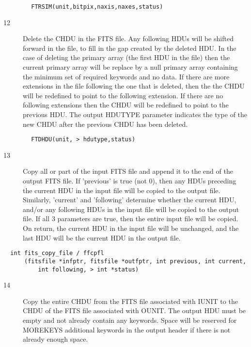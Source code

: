 \documentclass[11pt]{book}
\begin{document}
\begin{verbatim}
        FTRSIM(unit,bitpix,naxis,naxes,status)
\end{verbatim}

\begin{description}
\item[12] Delete the CHDU in the FITS file.  Any following HDUs will be shifted
    forward in the file, to fill in the gap created by the deleted
    HDU.  In the case of deleting the primary array (the first HDU in
    the file) then the current primary array will be replace by a null
    primary array containing the minimum set of required keywords and
    no data.  If there are more extensions in the file following the
    one that is deleted, then the the CHDU will be redefined to point
    to the following extension.  If there are no following extensions
    then the CHDU will be redefined to point to the previous HDU.  The
    output HDUTYPE parameter indicates the type of the new CHDU after
   the previous CHDU has been deleted.
\end{description}

\begin{verbatim}
        FTDHDU(unit, > hdutype,status)
\end{verbatim}

\begin{description}
\item[13]  Copy all or part of the input FITS file and append it
    to the end of the output FITS file.  If 'previous' is
    true (not 0), then any HDUs preceding the current HDU in the input file
    will be copied to the output file.  Similarly, 'current' and 'following'
    determine whether the current HDU, and/or any following HDUs in the
    input file will be copied to the output file. If all 3 parameters are
    true, then the entire input file will be copied.  On return, the current
    HDU in the input file will be unchanged, and the last HDU will be the
   current HDU in the output file.
\end{description}

\begin{verbatim}
  int fits_copy_file / ffcpfl
      (fitsfile *infptr, fitsfile *outfptr, int previous, int current,
          int following, > int *status)
\end{verbatim}

\begin{description}
\item[14] Copy the entire CHDU from the FITS file associated with IUNIT to the CHDU
    of the FITS file associated with OUNIT. The output HDU must be empty and
    not already contain any keywords.  Space will be reserved for MOREKEYS
    additional  keywords in the output header if there is not already enough
   space.
\end{description}
\end{document}
